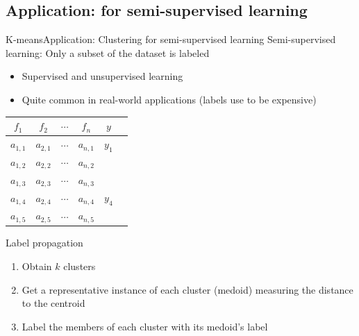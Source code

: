 \documentclass[10pt,compress]{beamer} %
\begin{document}
\subsection{Application: for semi-supervised learning}
\begin{frame}[plain]{K-means}{Application: Clustering for semi-supervised learning}
    Semi-supervised learning: Only a subset of the dataset is labeled
    \begin{itemize}
       \item Supervised and unsupervised learning
       \item Quite common in real-world applications (labels use to be expensive)
    \end{itemize} 

	\begin{center}
	\begin{tabular}{cccccc}\hline
	 	$f_1$     & $f_2$     & $\cdots$ & $f_n$     & $y$\\\hline
	 	$a_{1,1}$ & $a_{2,1}$ & $\cdots$ & $a_{n,1}$ & $y_1$ \\
	 	$a_{1,2}$ & $a_{2,2}$ & $\cdots$ & $a_{n,2}$ &  \\
	 	$a_{1,3}$ & $a_{2,3}$ & $\cdots$ & $a_{n,3}$ &  \\
	 	$a_{1,4}$ & $a_{2,4}$ & $\cdots$ & $a_{n,4}$ & $y_4$ \\
	 	$a_{1,5}$ & $a_{2,5}$ & $\cdots$ & $a_{n,5}$ &  \\
	 	\hline
	\end{tabular}
	\end{center}

    \begin{block}{Label propagation}
    \begin{enumerate}
       \item Obtain $k$ clusters
       \item Get a representative instance of each cluster (\alert{medoid}) measuring the distance to the centroid
       \item Label the members of each cluster with its medoid's label
    \end{enumerate} 
    \end{block}
\end{frame}

\end{document}
